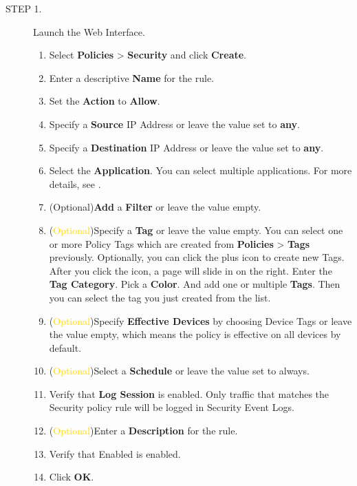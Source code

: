 \begin{description}
    \item[STEP 1.] Launch the Web Interface.
    \begin{enumerate} 
        \item Select \textbf{Policies} > \textbf{Security} and click \textbf{Create}.
        \item Enter a descriptive \textbf{Name} for the rule.
        \item Set the \textbf{Action} to \textbf{Allow}.
        \item Specify a \textbf{Source} IP Address or leave the value set to \textbf{any}.
        \item Specify a \textbf{Destination} IP Address or leave the value set to \textbf{any}.
        \item Select the \textbf{Application}. You can select multiple applications. For more details, see \hyperlink{link:Applications}{\color{linkblue}{Applications}}.
        \item (\textcolor[RGB]{205,153,16}{Optional})\textbf{Add} a \textbf{Filter} or leave the value empty.
        \item (\textcolor{gold}{Optional})Specify a \textbf{Tag} or leave the value empty.
        You can select one or more Policy Tags which are created from \textbf{Policies} > \textbf{Tags} previously. Optionally, you can click the plus icon to create new Tags.
         After you click the icon, a page will slide in on the right. Enter the \textbf{Tag Category}. Pick a \textbf{Color}. And add one or multiple \textbf{Tags}. 
         Then you can select the tag you just created from the list.
        \item (\textcolor{gold}{Optional})Specify \textbf{Effective Devices} by choosing Device Tags or leave the value empty, which means the policy is effective on all devices by default.
        \item (\textcolor{gold}{Optional})Select a \textbf{Schedule} or leave the value set to always.
        \item Verify that \textbf{Log Session} is enabled. Only traffic that matches the Security policy rule will be logged in Security Event Logs.
        \item (\textcolor{gold}{Optional})Enter a \textbf{Description} for the rule.
        \item Verify that Enabled is enabled.
        \item Click \textbf{OK}.
    \end{enumerate}

\end{description}
